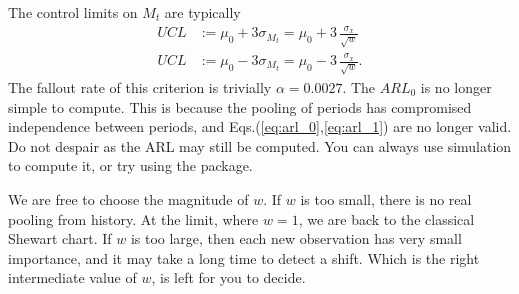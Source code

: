 The control limits on $M_t$ are typically
\begin{align}
	UCL &:= \mu_0 + 3 \sigma_{M_t}= \mu_0 + 3 \, \frac{\sigma_x}{\sqrt{w}} \\
	UCL &:= \mu_0 - 3 \sigma_{M_t}= \mu_0 - 3 \, \frac{\sigma_x}{\sqrt{w}}.
\end{align}
The fallout rate of this criterion is trivially $\alpha=0.0027$. 
The $ARL_0$ is no longer simple to compute. 
This is because the pooling of periods has compromised independence between periods, and Eqs.(\ref{eq:arl_0},\ref{eq:arl_1}) are no longer valid. 
Do not despair as the ARL may still be computed. 
You can always use simulation to compute it, or try using the  \R package.




We are free to choose the magnitude of $w$. 
If $w$ is too small, there is no real pooling from history. At the limit, where $w=1$, we are back to the classical Shewart chart. 
If $w$ is too large, then each new observation has very small importance, and it may take a long time to detect a shift.
Which is the right intermediate value of $w$, is left for you to decide.






